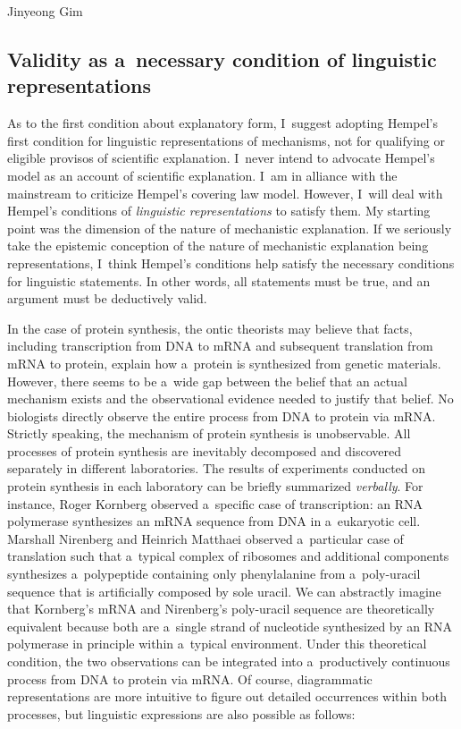 \begin{artengenv}{Jinyeong Gim}
\subsection{Validity as a~necessary condition of linguistic representations}

As to the first condition about explanatory form, I~suggest adopting Hempel's first condition for linguistic representations of mechanisms, not for qualifying or eligible provisos of scientific explanation. I~never intend to advocate Hempel's model as an account of scientific explanation. I~am in alliance with the mainstream to criticize Hempel's covering law model. However, I~will deal with Hempel's conditions of \textit{linguistic representations} to satisfy them. My starting point was the dimension of the nature of mechanistic explanation. If we seriously take the epistemic conception of the nature of mechanistic explanation being representations, I~think Hempel's conditions help satisfy the necessary conditions for linguistic statements. In other words, all statements must be true, and an argument must be deductively valid.

In the case of protein synthesis, the ontic theorists may believe that facts, including transcription from DNA to mRNA and subsequent translation from mRNA to protein, explain how a~protein is synthesized from genetic materials. However, there seems to be a~wide gap between the belief that an actual mechanism exists and the observational evidence needed to justify that belief. No biologists directly observe the entire process from DNA to protein via mRNA. Strictly speaking, the mechanism of protein synthesis is unobservable. All processes of protein synthesis are inevitably decomposed and discovered separately in different laboratories. The results of experiments conducted on protein synthesis in each laboratory can be briefly summarized \textit{verbally}. For instance, Roger Kornberg observed a~specific case of transcription: an RNA polymerase synthesizes an mRNA sequence from DNA in a~eukaryotic cell. Marshall Nirenberg and Heinrich Matthaei observed a~particular case of translation such that a~typical complex of ribosomes and additional components synthesizes a~polypeptide containing only phenylalanine from a~poly-uracil sequence that is artificially composed by sole uracil. We can abstractly imagine that Kornberg's mRNA and Nirenberg's poly-uracil sequence are theoretically equivalent because both are a~single strand of nucleotide synthesized by an RNA polymerase in principle within a~typical environment. Under this theoretical condition, the two observations can be integrated into a~productively continuous process from DNA to protein via mRNA. Of course, diagrammatic representations are more intuitive to figure out detailed occurrences within both processes, but linguistic expressions are also possible as follows:


\end{artengenv}
